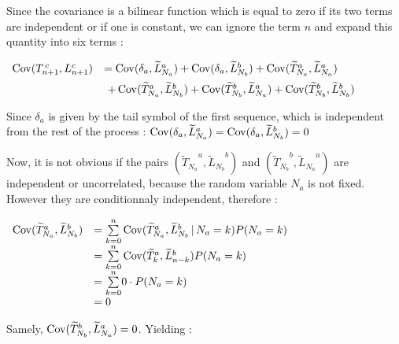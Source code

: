 Since the covariance is a bilinear function which is equal
to zero if its two terms are independent or if one is constant,
we can ignore the term $n$ and expand this quantity into six terms :

\vspace{\baselineskip}
$
\begin{array}{rl}
   \operatorname{Cov}(T_{n+1}^{\,c}, L_{n+1}^c) 
    &
            = \operatorname{Cov}( \delta_a, {{\widetilde{L}}_{N_a}}^a )
              + \operatorname{Cov} (\delta_a,  {{\widetilde{L}}_{N_b}}^b)
              + \operatorname{Cov} ( {{\widetilde{T}}_{N_a}}^a,
                         {{\widetilde{L}}_{N_a}}^a ) \\[2mm]
    & \,\,
              + \operatorname{Cov} ( {{\widetilde{T}}_{N_a}}^a, 
                          {{\widetilde{L}}_{N_b}}^b )
              + \operatorname{Cov} ( {{\widetilde{T}}_{N_b}}^b,
                          {{\widetilde{L}}_{N_a}}^a ) 
              + \operatorname{Cov} ( {{\widetilde{T}}_{N_b}}^b, 
                          {{\widetilde{L}}_{N_b}}^b )
\end{array}
$
\vspace{\baselineskip}


Since $\delta_a$ is given by the tail symbol of the first sequence, which
is independent from the rest of the process :
$  \operatorname{Cov}( \delta_a, {{\widetilde{L}}_{N_a}}^a ) = 
       \operatorname{Cov}( \delta_a, {{\widetilde{L}}_{N_b}}^b ) = 0 $

Now, it is not obvious if the pairs $({{\tilde T}_{N_a}}^a, {{\tilde L}_{N_b}}^b)$
and $({{\tilde T}_{N_b}}^b, {{\tilde L}_{N_a}}^a)$ are independent or 
uncorrelated, because the 
random variable $N_a$ is not fixed. However they are conditionnaly independent,
therefore :

\vspace{\baselineskip}

$
\begin{array}{cl}
   \Cov ( {{\tilde T}_{N_a}}^a, 
                          {{\tilde L}_{N_b}}^b )
      & = \Sum{k=0}{n} \Cov ( {{\tilde T}_{N_a}}^a, 
                          {{\tilde L}_{N_b}}^b  \, | \, N_a = k) P(N_a = k) \\[2mm]
      & = \Sum{k=0}{n} \Cov ( {{\tilde T}_{k}}^a, 
                          {{\tilde L}_{n-k}}^b ) P(N_a = k) \\[2mm]
      & = \Sum{k=0}{n} 0 \cdot P(N_a = k) \\[2mm]
      & = 0
\end{array}
$
\vspace{\baselineskip}

Samely, $\operatorname{Cov} ( {{\widetilde{T}}_{N_b}}^b,
                          {{\widetilde{L}}_{N_a}}^a ) = 0$.
Yielding :


